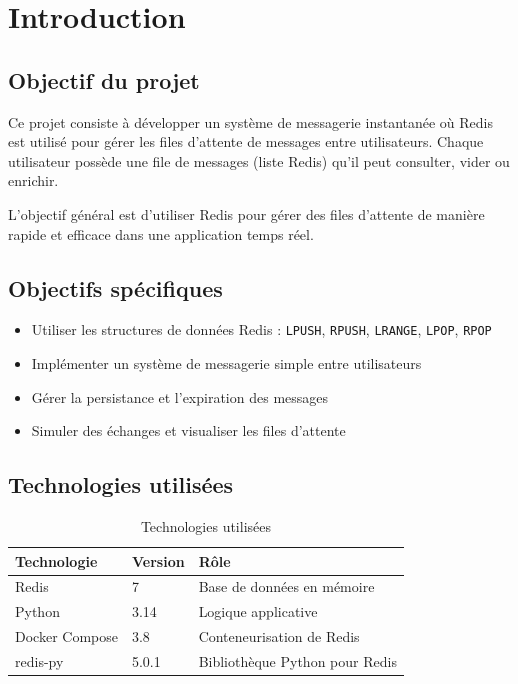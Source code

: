 \documentclass[12pt,a4paper]{article}
\begin{document}
\newpage
\tableofcontents
\newpage

\section{Introduction}

\subsection{Objectif du projet}

Ce projet consiste \`a d\'evelopper un syst\`eme de messagerie instantan\'ee o\`u Redis est utilis\'e pour g\'erer les files d'attente de messages entre utilisateurs. Chaque utilisateur poss\`ede une file de messages (liste Redis) qu'il peut consulter, vider ou enrichir.

L'objectif g\'en\'eral est d'utiliser Redis pour g\'erer des files d'attente de mani\`ere rapide et efficace dans une application temps r\'eel.

\subsection{Objectifs sp\'ecifiques}

\begin{itemize}
    \item Utiliser les structures de donn\'ees Redis : \texttt{LPUSH}, \texttt{RPUSH}, \texttt{LRANGE}, \texttt{LPOP}, \texttt{RPOP}
    \item Impl\'ementer un syst\`eme de messagerie simple entre utilisateurs
    \item G\'erer la persistance et l'expiration des messages
    \item Simuler des \'echanges et visualiser les files d'attente
\end{itemize}

\subsection{Technologies utilis\'ees}

\begin{table}[H]
\centering
\begin{tabular}{|l|l|l|}
\hline
\textbf{Technologie} & \textbf{Version} & \textbf{R\^ole} \\
\hline
Redis & 7 & Base de donn\'ees en m\'emoire \\
Python & 3.14 & Logique applicative \\
Docker Compose & 3.8 & Conteneurisation de Redis \\
redis-py & 5.0.1 & Biblioth\`eque Python pour Redis \\
\hline
\end{tabular}
\caption{Technologies utilis\'ees}
\end{table}
\end{document}
